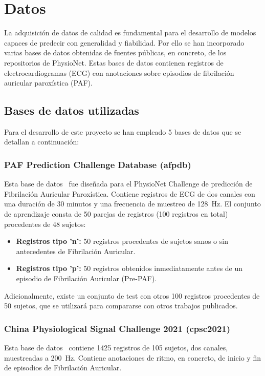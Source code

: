 
\chapter{Datos}
\label{chap:datos}

La adquisición de datos de calidad es fundamental para el desarrollo de modelos capaces
de predecir con generalidad y fiabilidad. Por ello se han incorporado varias bases de datos
obtenidas de fuentes públicas, en concreto, de los repositorios de PhysioNet.
Estas bases de datos contienen registros de electrocardiogramas (ECG) con anotaciones
sobre episodios de fibrilación auricular paroxística (PAF).

\section{Bases de datos utilizadas}
\label{sec:bases_datos}

Para el desarrollo de este proyecto se han empleado 5 bases de datos que se detallan a continuación:

\subsection{PAF Prediction Challenge Database (afpdb)}
\label{subsec:afpdb}
Esta base de datos~\cite{moody_paf_2001} fue diseñada para el PhysioNet Challenge de predicción de
Fibrilación Auricular Paroxística. Contiene registros de ECG de dos canales con
una duración de 30 minutos y una frecuencia de muestreo de 128~Hz. El conjunto de
aprendizaje consta de 50 parejas de registros (100 registros en total) procedentes
de 48 sujetos:
\begin{itemize}
  \item \textbf{Registros tipo 'n':} 50 registros procedentes de sujetos sanos o sin antecedentes de Fibrilación Auricular.
  \item \textbf{Registros tipo 'p':} 50 registros obtenidos inmediatamente antes de un episodio de Fibrilación Auricular (Pre-PAF).
\end{itemize}
Adicionalmente, existe un conjunto de test con otros 100 registros procedentes de 50 sujetos, que se utilizará para compararse
con otros trabajos publicados.

\subsection{China Physiological Signal Challenge 2021 (cpsc2021)}
\label{subsec:cpsc2021}
Esta base de datos~\cite{PhysioNet-cpsc2021-1.0.0} contiene 1425 registros de 105 sujetos,
dos canales, muestreadas a 200~Hz. Contiene anotaciones
de ritmo, en concreto, de inicio y fin de episodios de Fibrilación Auricular.

